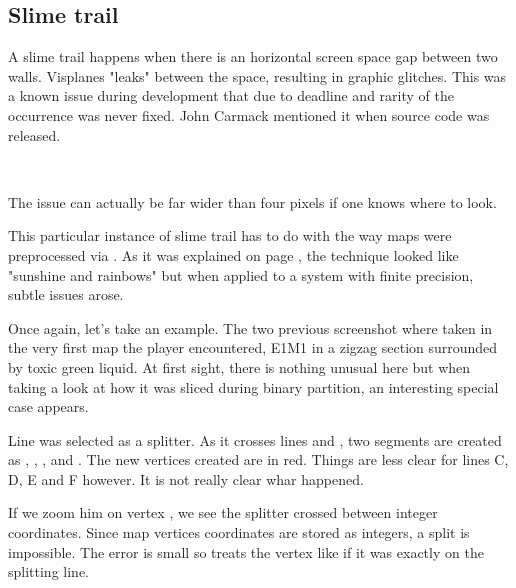 \subsection{Slime trail}
A slime trail happens when there is an horizontal screen space gap between two walls. Visplanes "leaks" between the space, resulting in graphic glitches. This was a known issue during development that due to deadline and rarity of the occurrence was never fixed. John Carmack mentioned it when  source code was released.\\
\par
{}\\
\par



The issue can actually be far wider than four pixels if one knows where to look.\\
\par
{}
\par
This particular instance of slime trail has to do with the way maps were preprocessed via . As it was explained on page \pageref{Binary Space Partitioning: Theory}, the technique looked like "sunshine and rainbows" but when applied to a system with finite precision, subtle issues arose.\\
\par
 Once again, let's take an example. The two previous screenshot where taken in the very first map the player encountered, E1M1 in a zigzag section surrounded by toxic green liquid. At first sight, there is nothing unusual here but when taking a look at how it was sliced during binary partition, an interesting special case appears.\\
\par
Line  was selected as a splitter. As it crosses lines  and , two segments are created as , , , and . The new vertices created are in red. Things are less clear for lines C, D, E and F however. It is not really clear whar happened. \\
\par
If we zoom him on vertex , we see the splitter crossed  between integer coordinates. Since map vertices coordinates are stored as integers, a split is impossible. The error is small so  treats the vertex like if it was exactly on the splitting line.

